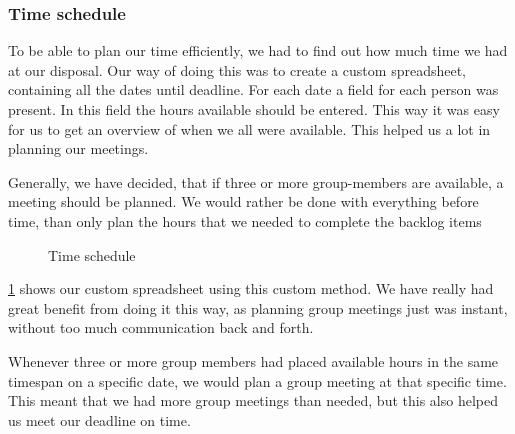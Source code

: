 \subsubsection{Time schedule}
To be able to plan our time efficiently, we had to find out how much time we had at our disposal. Our way of doing this was to create a custom spreadsheet, containing all the dates until deadline. For each date a field for each person was present. In this field the hours available should be entered. This way it was easy for us to get an overview of when we all were available. This helped us a lot in planning our meetings.

Generally, we have decided, that if three or more group-members are available, a meeting should be planned. We would rather be done with everything before time, than only plan the hours that we needed to complete the backlog items

\begin{figure}[H]
  \caption{Time schedule}
  \label{time schedule}
\end{figure}

\cref{time schedule} shows our custom spreadsheet using this custom method. We have really had great benefit from doing it this way, as planning group meetings just was instant, without too much communication back and forth.

Whenever three or more group members had placed available hours in the same timespan on a specific date, we would plan a group meeting at that specific time. This meant that we had more group meetings than needed, but this also helped us meet our deadline on time.